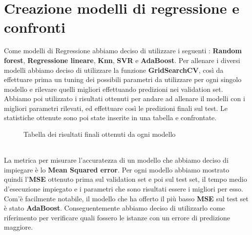 \section*{Creazione modelli di regressione e confronti}
Come modelli di Regressione abbiamo deciso di utilizzare i seguenti : \textbf{Random forest}, \textbf{Regressione lineare}, \textbf{Knn}, \textbf{SVR} e \textbf{AdaBoost}.
Per allenare i diversi modelli abbiamo deciso di utilizzare la funzione \textbf{GridSearchCV}, così da effettuare prima un tuning dei possibili parametri da utilizzare per ogni singolo modello e rilevare quelli migliori effettuando predizioni nei validation set.
Abbiamo poi utilizzato i risultati ottenuti per andare ad allenare il modelli con i migliori parametri rilevati, ed effettuare così le predizioni finali sul test. Le statistiche ottenute sono poi state inserite in una tabella e confrontate.
\begin{figure}[htbp]
    \centerline{}
   \caption{Tabella dei risultati finali ottenuti da ogni modello}
\end{figure}
\\La metrica per misurare l'accuratezza di un modello che abbiamo deciso di impiegare è lo \textbf{Mean Squared error}. Per ogni modello abbiamo mostrato quindi l'\textbf{MSE} ottenuto prima sul validation set e poi sul test set, il tempo medio d'esecuzione impiegato e i parametri che sono risultati essere i migliori per esso.
Com'è facilmente notabile, il modello che ha offerto il più basso \textbf{MSE} sul test set è stato \textbf{AdaBoost}. Conseguentemente abbiamo deciso di utilizzarlo come riferimento per verificare quali fossero le istanze con un errore di predizione maggiore.

